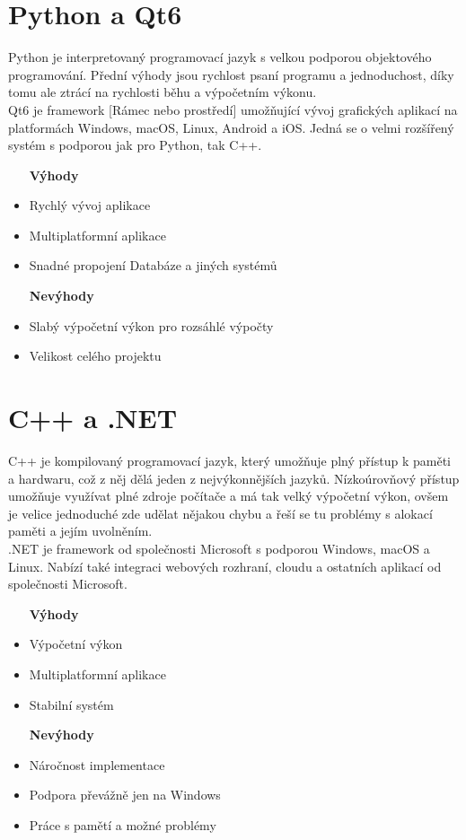 \documentclass[twoside]{ctuthesis}
\begin{document}
\section{Python a Qt6}
Python je interpretovaný programovací jazyk s velkou podporou objektového programování. Přední výhody jsou rychlost psaní programu a jednoduchost, díky tomu ale ztrácí na rychlosti běhu a výpočetním výkonu. \\
Qt6 je framework [Rámec nebo prostředí] umožňující vývoj grafických aplikací na platformách Windows, macOS, Linux, Android a iOS. Jedná se o velmi rozšířený systém s podporou jak pro Python, tak C++.

\begin{itemize}
\setlength{\itemindent}{0.7cm}
    \item [\textbf{Výhody}]
    \item Rychlý vývoj aplikace
    \item Multiplatformní aplikace
    \item Snadné propojení Databáze a jiných systémů
\end{itemize}
\begin{itemize}
\setlength{\itemindent}{1.1cm}
    \item [\textbf{Nevýhody}]
    \setlength{\itemindent}{0.7cm}
    \item Slabý výpočetní výkon pro rozsáhlé výpočty
    \item Velikost celého projektu
\end{itemize}

\section{C++ a .NET}
C++ je kompilovaný programovací jazyk, který umožňuje plný přístup k paměti a hardwaru, což z něj dělá jeden z nejvýkonnějších jazyků. Nízkoúrovňový přístup umožňuje využívat plné zdroje počítače a má tak velký výpočetní výkon, ovšem je velice jednoduché zde udělat nějakou chybu a řeší se tu problémy s alokací paměti a jejím uvolněním. \\
.NET je framework od společnosti Microsoft s podporou Windows, macOS a Linux. Nabízí také integraci webových rozhraní, cloudu a ostatních aplikací od společnosti Microsoft.

\begin{itemize}
\setlength{\itemindent}{0.7cm}
    \item [\textbf{Výhody}]
    \item Výpočetní výkon
    \item Multiplatformní aplikace
    \item Stabilní systém
\end{itemize}
\begin{itemize}
\setlength{\itemindent}{1.1cm}
    \item [\textbf{Nevýhody}]
    \setlength{\itemindent}{0.7cm}
    \item Náročnost implementace
    \item Podpora převážně jen na Windows
    \item Práce s pamětí a možné problémy
\end{itemize}
\end{document}
